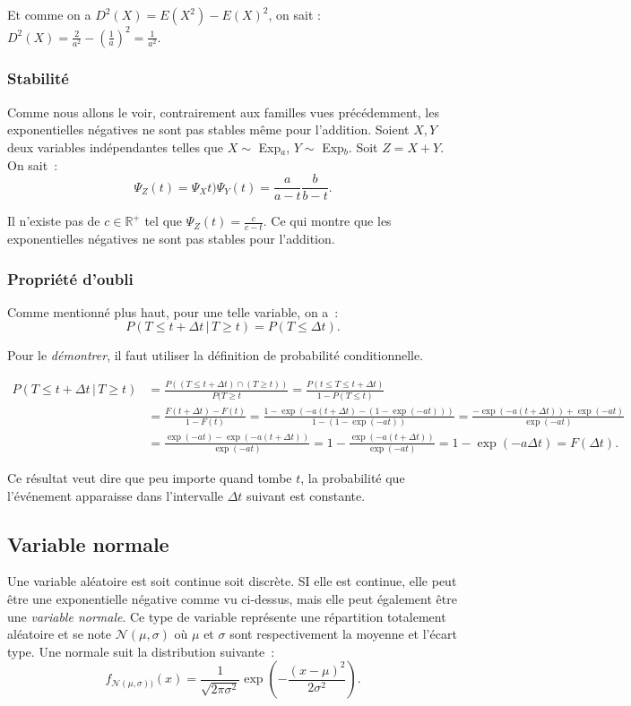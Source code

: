 \documentclass{article}
\newcommand{\Nms}{{\mathcal N(\mu, \sigma)}}
\begin{document}
			Et comme on a $D^2(X) = E(X^2) - E(X)^2$, on sait : $D^2(X) = \frac 2{a^2} - \left(\frac 1a\right)^2 = \frac 1{a^2}$.

		\subsubsection{Stabilité}
			Comme nous allons le voir, contrairement aux familles vues précédemment, les exponentielles négatives ne sont pas stables même pour l'addition. Soient $X, Y$
			deux variables indépendantes telles que $X \sim $ Exp$_a$, $Y \sim $ Exp$_b$. Soit $Z = X + Y$. On sait~:
			\[\Psi_Z(t) = \Psi_Xt)\Psi_Y(t) = \frac a{a-t}\frac b{b-t}.\]

			Il n'existe pas de $c \in \mathbb R^+$ tel que $\Psi_Z(t) = \frac c{c-t}$. Ce qui montre que les exponentielles négatives ne sont pas stables pour
			l'addition.

		\subsubsection{Propriété d'oubli}
			Comme mentionné plus haut, pour une telle variable, on a~:
			\[P(T \leq t + \Delta t \, | \, T \geq t) = P(T \leq \Delta t).\]

			Pour le \textit{démontrer}, il faut utiliser la définition de probabilité conditionnelle.

			\begin{align*}
				P(T \leq t + \Delta t \, | \, T \geq t) &= \frac {P((T \leq t + \Delta t) \cap (T \geq t))}{P(T \geq t}
					= \frac {P(t \leq T \leq t+\Delta t)}{1-P(T \leq t)} \\
				&= \frac {F(t+\Delta t) - F(t)}{1-F(t)} = \frac {1-\exp(-a(t+\Delta t) - (1-\exp(-at)))}{1-(1-\exp(-at))}
					= \frac {-\exp(-a(t+\Delta t)) + \exp(-at)}{\exp(-at)} \\
				&= \frac {\exp(-at) - \exp(-a(t+\Delta t))}{\exp(-at)} = 1 - \frac {\exp(-a(t+\Delta t))}{\exp(-at)} = 1 - \exp(-a\Delta t) = F(\Delta t).
			\end{align*}

			Ce résultat veut dire que peu importe quand tombe $t$, la probabilité que l'événement apparaisse dans l'intervalle $\Delta t$ suivant est constante.

	\subsection{Variable normale}
		Une variable aléatoire est soit continue soit discrète. SI elle est continue, elle peut être une exponentielle négative comme vu ci-dessus, mais elle peut
		également être une \textit{variable normale}. Ce type de variable représente une répartition totalement aléatoire et se note $\Nms$ où $\mu$ et $\sigma$ sont
		respectivement la moyenne et l'écart type. Une normale suit la distribution suivante~:
		\[f_{\Nms)}(x) = \frac 1{\sqrt {2\pi\sigma^2}}\exp\left(-\frac {(x-\mu)^2}{2\sigma^2}\right).\]
\end{document}
